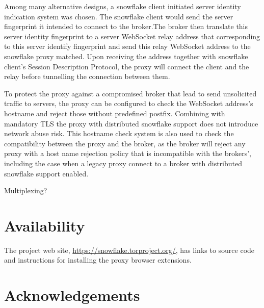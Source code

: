 \documentclass[letterpaper,twocolumn]{article}
\begin{document}
Among many alternative designs, a snowflake client initiated server identity indication system was chosen. The snowflake client would send the server fingerprint it intended to connect to the broker.The broker then translate this server identity fingerprint to a server WebSocket relay address that corresponding to this server identify fingerprint and send this relay WebSocket address to the snowflake proxy matched. Upon receiving the address together with snowflake client's Session Description Protocol, the proxy will connect the client and the relay before tunnelling the connection between them.

To protect the proxy against a compromised broker that lead to send unsolicited traffic to servers, the proxy can be configured to check the WebSocket address's hostname and reject those without predefined postfix. Combining with mandatory TLS the proxy with distributed snowflake support does not introduce network abuse risk. This hostname check system is also used to check the compatibility between the proxy and the broker, as the broker will reject any proxy with a host name rejection policy that is incompatible with the brokers', including the case when a legacy proxy connect to a broker with distributed snowflake support enabled.

Multiplexing?

\section*{Availability}

The project web site,
\url{https://snowflake.torproject.org/},
has links to source code
and instructions for installing the proxy browser extensions.

\section*{Acknowledgements}
\end{document}
